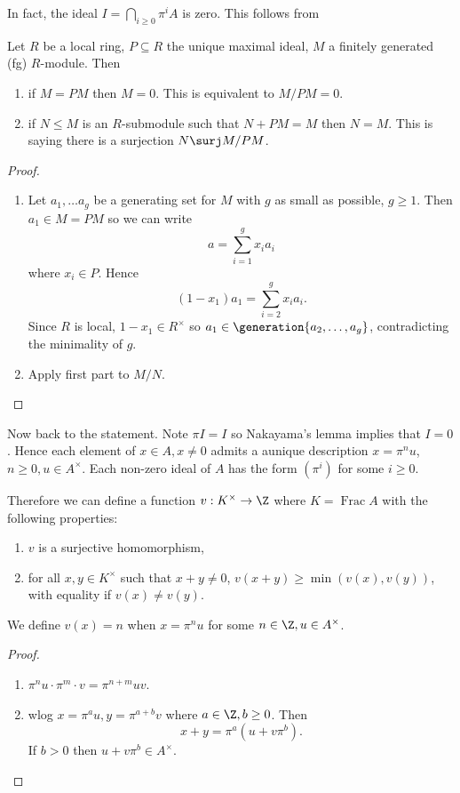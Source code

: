 \documentclass[a4paper]{article}
\theoremstyle{definition}
\DeclareMathOperator{\Frac}{Frac}
\begin{document}
In fact, the ideal \(I = \bigcap_{i \geq 0} \pi^i A\) is zero. This follows from
\begin{lemma}
  Let \(R\) be a local ring, \(P \subseteq R\) the unique maximal ideal, \(M\) a finitely generated (fg) \(R\)-module. Then
  \begin{enumerate}
  \item if \(M = P M\) then \(M = 0\). This is equivalent to \(M/PM = 0\).
  \item if \(N \leq M\) is an \(R\)-submodule such that \(N + PM = M\) then \(N = M\). This is saying there is a surjection \(N \surj M/PM\).
  \end{enumerate}
\end{lemma}

\begin{proof}\leavevmode
  \begin{enumerate}
  \item Let \(a_1, \dots a_g\) be a generating set for \(M\) with \(g\) as small as possible, \(g \geq 1\). Then \(a_1 \in M = PM\) so we can write
    \[
      a = \sum_{i = 1}^g x_i a_i
    \]
    where \(x_i \in P\). Hence
    \[
      (1 - x_1) a_1 = \sum_{i = 2}^g x_i a_i.
    \]
    Since \(R\) is local, \(1 - x_1 \in R^\times\) so \(a_1 \in \generation{a_2, \dots, a_g}\), contradicting the minimality of \(g\).
  \item Apply first part to \(M/N\).
  \end{enumerate}
\end{proof}

Now back to the statement. Note \(\pi I = I\) so Nakayama's lemma implies that \(I = 0\). Hence each element of \(x \in A, x \neq 0\) admits a aunique description \(x = \pi^n u\), \(n \geq 0, u \in A^\times\). Each non-zero ideal of \(A\) has the form \((\pi^i)\) for some \(i \geq 0\).

Therefore we can define a function \(v: K^\times \to \Z\) where \(K = \Frac A\) with the following properties:
\begin{enumerate}
\item \(v\) is a surjective homomorphism,
\item for all \(x, y \in K^\times\) such that \(x + y \neq 0\), \(v(x + y) \geq \min(v(x), v(y))\), with equality if \(v(x) \neq v(y)\).
\end{enumerate}
We define \(v(x) = n\) when \(x = \pi^n u\) for some \(n \in \Z, u \in A^\times\).

\begin{proof}\leavevmode
  \begin{enumerate}
  \item \(\pi^n u \cdot \pi^m \cdot v = \pi^{n + m} uv\).
  \item wlog \(x = \pi^a u, y = \pi^{a + b} v\) where \(a \in \Z, b \geq 0\). Then
    \[
      x + y = \pi^a(u + v \pi^ b).
    \]
    If \(b > 0\) then \(u + v \pi^b \in A^\times\).
  \end{enumerate}
\end{proof}
\end{document}
